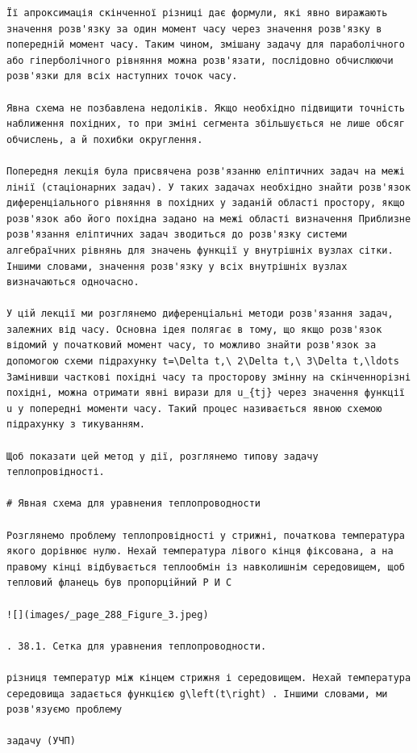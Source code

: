\documentclass[
  ukrainian,
]{article}
\begin{document}
\begin{verbatim}
Її апроксимація скінченної різниці дає формули, які явно виражають значення розв'язку за один момент часу через значення розв'язку в попередній момент часу. Таким чином, змішану задачу для параболічного або гіперболічного рівняння можна розв'язати, послідовно обчислюючи розв'язки для всіх наступних точок часу.

Явна схема не позбавлена недоліків. Якщо необхідно підвищити точність наближення похідних, то при зміні сегмента збільшується не лише обсяг обчислень, а й похибки округлення.

Попередня лекція була присвячена розв'язанню еліптичних задач на межі лінії (стаціонарних задач). У таких задачах необхідно знайти розв'язок диференціального рівняння в похідних у заданій області простору, якщо розв'язок або його похідна задано на межі області визначення Приблизне розв'язання еліптичних задач зводиться до розв'язку системи алгебраїчних рівнянь для значень функції у внутрішніх вузлах сітки. Іншими словами, значення розв'язку у всіх внутрішніх вузлах визначаються одночасно.

У цій лекції ми розглянемо диференціальні методи розв'язання задач, залежних від часу. Основна ідея полягає в тому, що якщо розв'язок відомий у початковий момент часу, то можливо знайти розв'язок за допомогою схеми підрахунку t=\Delta t,\ 2\Delta t,\ 3\Delta t,\ldots Замінивши часткові похідні часу та просторову змінну на скінченнорізні похідні, можна отримати явні вирази для u_{tj} через значення функції u у попередні моменти часу. Такий процес називається явною схемою підрахунку з тикуванням.

Щоб показати цей метод у дії, розглянемо типову задачу теплопровідності.

# Явная схема для уравнения теплопроводности

Розглянемо проблему теплопровідності у стрижні, початкова температура якого дорівнює нулю. Нехай температура лівого кінця фіксована, а на правому кінці відбувається теплообмін із навколишнім середовищем, щоб тепловий фланець був пропорційний P И С

![](images/_page_288_Figure_3.jpeg)

. 38.1. Сетка для уравнения теплопроводности.

різниця температур між кінцем стрижня і середовищем. Нехай температура середовища задається функцією g\left(t\right) . Іншими словами, ми розв'язуємо проблему

задачу (УЧП)
\end{verbatim}
\end{document}
